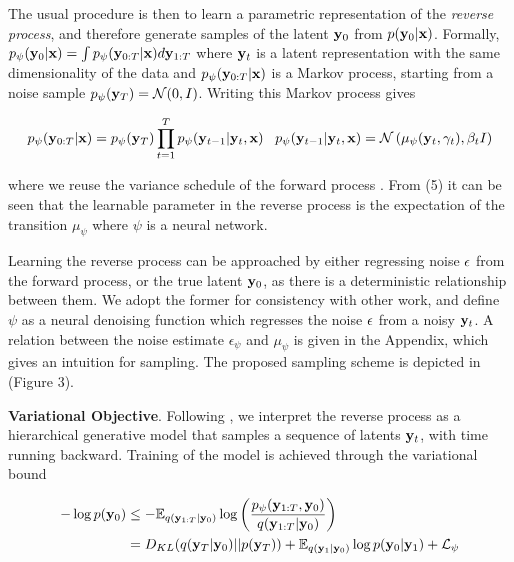 \documentclass{article}
\begin{document}
The usual procedure is then to learn a parametric representation of the \emph{reverse process}, and therefore generate samples of the latent $\bold{y}_{0}$ from  $p(\bold{y}_{0}|\bold{x})$. Formally, $p_{\psi}(\bold{y}_{0}|\bold{x}) = \int p_{\psi}(\bold{y}_{0:T}|\bold{x})d\bold{y}_{1:T}$ where $\bold{y}_{t}$ is a latent representation with the same dimensionality of the data and $p_{\psi}(\bold{y}_{0:T}|\bold{x})$ is a Markov process, starting from a noise sample $p_{\psi}(\bold{y}_{T}) = \mathcal{N}(0,I)$. Writing this Markov process gives

\begin{equation}
p_{\psi}(\bold{y}_{0:T}|\bold{x}) = p_{\psi}(\bold{y}_{T})\prod_{t=1}^{T} p_{\psi}(\bold{y}_{t-1}|\bold{y}_{t},\bold{x}) \;\;\; p_{\psi}(\bold{y}_{t-1}|\bold{y}_{t},\bold{x}) = \mathcal{N}\left(\mu_{\psi}(\bold{y}_{t},\gamma_{t}),\beta_{t}I\right)
\end{equation}

where we reuse the variance schedule of the forward process \citep{Ho2020}. From (5) it can be seen that the learnable parameter in the reverse process is the expectation of the transition $\mu_{\psi}$ where $\psi$ is a neural network. 

Learning the reverse process can be approached by either regressing noise $\bold{\epsilon}$ from the forward process, or the true latent $\bold{y}_{0}$, as there is a deterministic relationship between them. We adopt the former for consistency with other work, and define $\psi$ as a neural denoising function which regresses the noise $\bold{\epsilon}$ from a noisy $\bold{y}_{t}$. A relation between the noise estimate $\epsilon_{\psi}$ and $\mu_{\psi}$ is given in the Appendix, which gives an intuition for sampling. The proposed sampling scheme is depicted in (Figure 3). 

\textbf{Variational Objective}. Following \citep{Kingma2021}, we interpret the reverse process as a hierarchical generative model that samples a sequence of latents $\bold{y}_{t}$, with time running backward. Training of the model is achieved through the variational bound

\begin{align}
-\log p(\bold{y}_{0}) &\leq -\mathbb{E}_{q(\bold{y}_{1:T}|\bold{y}_{0})} \log \left(\frac{p_{\psi}(\bold{y}_{1:T},\bold{y}_{0})}{q(\bold{y}_{1:T}|\bold{y}_{0})}\right) \\
&=  D_{KL}(q(\bold{y}_{T}|\bold{y}_{0}) || p(\bold{y}_{T})) + \mathbb{E}_{q(\bold{y}_{1}|\bold{y}_{0})} \log p(\bold{y}_{0}|\bold{y}_{1}) + \mathcal{L}_{\psi}
\end{align}
\end{document}
